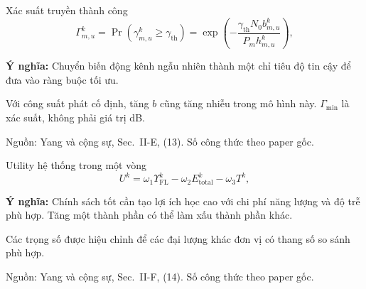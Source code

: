\documentclass[10pt,aspectratio=43]{beamer}
\newcommand{\source}[1]{\par\vfill{\fontsize{5.8}{7}\selectfont\color{Muted}Nguồn: #1\par}}
\newcommand{\paperref}[1]{\source{Yang và cộng sự, Sec.~#1. Số công thức theo paper gốc.}}
\newcommand{\eqmeaning}[1]{\par\medskip\textcolor{HustRed}{\textbf{Ý nghĩa:}} #1\par}
\newcommand{\noteonly}[1]{\par{\footnotesize\color{Muted}#1\par}}
\newcommand{\FL}{\mathrm{FL}}
\newcommand{\tot}{\mathrm{total}}
\begin{document}
\begin{frame}[t]{Xác suất truyền thành công}
\relax
\begin{equation}\Gamma_{m,u}^k=\Pr(\gamma_{m,u}^k\geq\gamma_{\mathrm{th}})=\exp\!\left(-\frac{\gamma_{\mathrm{th}}N_0b_{m,u}^k}{P_mh_{m,u}^k}\right),\tag{13}\end{equation}\par{}\eqmeaning{Chuyển biến động kênh ngẫu nhiên thành một chỉ tiêu độ tin cậy để đưa vào ràng buộc tối ưu.}
\noteonly{Với công suất phát cố định, tăng $b$ cũng tăng nhiễu trong mô hình này. $\Gamma_{\min}$ là xác suất, không phải giá trị dB.}
\paperref{II-E, (13)}
\end{frame}

\begin{frame}[t]{Utility hệ thống trong một vòng}
\relax
\begin{equation}U^k=\omega_1\Upsilon_{\FL}^k-\omega_2E_{\tot}^k-\omega_3T^k,\tag{14}\end{equation}\par{}\eqmeaning{Chính sách tốt cần tạo lợi ích học cao với chi phí năng lượng và độ trễ phù hợp. Tăng một thành phần có thể làm xấu thành phần khác.}
\noteonly{Các trọng số được hiệu chỉnh để các đại lượng khác đơn vị có thang số so sánh phù hợp.}
\paperref{II-F, (14)}
\end{frame}
\end{document}
